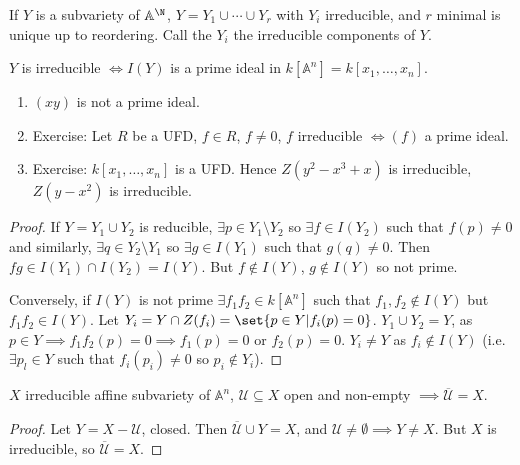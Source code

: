 \documentclass{article}
\newcommand{\A}{\mathbb{A}}
\begin{document}
\begin{ex}
    If $Y$ is a subvariety of $\A^\N$, $Y = Y_1 \cup \dotsb \cup Y_r$ with $Y_i$ irreducible, and $r$ minimal is unique up to reordering. Call the $Y_i$ the irreducible components of $Y$. %
\end{ex}
\begin{prop}
    $Y$ is irreducible $\iff I(Y)$ is a prime ideal in $k[\A^n] = k[x_1, \dotsc, x_n]$.
\end{prop}
\begin{eg}
    \leavevmode
    \begin{enumerate}[label=(\roman*)]
        \item $(x y)$ is not a prime ideal.
        \item Exercise: Let $R$ be a UFD, $f \in R$, $f \neq 0$, $f$ irreducible $\iff (f)$ a prime ideal.
        \item Exercise: $k[x_1, \dotsc, x_n]$ is a UFD.
            Hence $Z(y^2 - x^3 + x)$ is irreducible, $Z(y-x^2)$ is irreducible.
    \end{enumerate}
\end{eg}
\begin{proof}
    If $Y = Y_1 \cup Y_2$ is reducible, $\exists p \in Y_1 \setminus Y_2$ so $\exists f \in I(Y_2)$ such that $f(p) \neq 0$ and similarly, $\exists q \in Y_2 \setminus Y_1$ so $\exists g \in I(Y_1)$ such that $g(q) \neq 0$.
    Then $fg \in I(Y_1) \cap I(Y_2) = I(Y)$. But $f \notin I(Y)$, $g \notin I(Y)$ so not prime.
    \begin{center}
    \end{center}

    Conversely, if $I(Y)$ is not prime $\exists f_1 f_2 \in k[\A^n]$ such that $f_1, f_2 \notin I(Y)$ but $f_1 f_2 \in I(Y)$.
    Let $Y_i = Y \cap Z(f_i) = \set{p \in Y | f_i(p) = 0}$. $Y_1 \cup Y_2 = Y$, as $p \in Y \implies f_1 f_2 (p) = 0 \implies f_1(p) = 0$ or $f_2(p) = 0$.
    $Y_i \neq Y$ as $f_i \notin I(Y)$ (i.e. $\exists p_l \in Y$ such that $f_i(p_i) \neq 0$ so $p_i \notin Y_i$).
\end{proof}
\begin{lemma}
    $X$ irreducible affine subvariety of $\A^n$, $\mathcal{U} \subseteq X$ open and non-empty $\implies \overline{\mathcal{U}} = X$.
\end{lemma}
\begin{proof}
    Let $Y = X - \mathcal{U}$, closed. Then $\overline{\mathcal{U}} \cup Y = X$, and $\mathcal{U} \neq \emptyset \implies Y \neq X$. But $X$ is irreducible, so $\overline{\mathcal{U}} = X$.
\end{proof}
\end{document}
